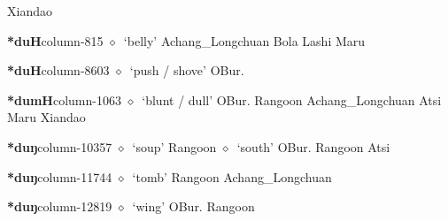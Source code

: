          Xiandao 
  \item {\footnotesize \textbf{*duH}}{\tiny column-815}
         $\diamond$~`belly'
         Achang\_Longchuan 
\hspace{1ex}
         Bola 
\hspace{1ex}
         Lashi 
\hspace{1ex}
         Maru 
  \item {\footnotesize \textbf{*duH}}{\tiny column-8603}
         $\diamond$~`push / shove'
         OBur. 
  \item {\footnotesize \textbf{*dumH}}{\tiny column-1063}
         $\diamond$~`blunt / dull'
         OBur. 
\hspace{1ex}
         Rangoon 
\hspace{1ex}
         Achang\_Longchuan 
\hspace{1ex}
         Atsi 
\hspace{1ex}
         Maru 
\hspace{1ex}
         Xiandao 
  \item {\footnotesize \textbf{*duŋ}}{\tiny column-10357}
         $\diamond$~`soup'
         Rangoon 
\hspace{1ex}
         $\diamond$~`south'
         OBur. 
\hspace{1ex}
         Rangoon 
\hspace{1ex}
         Atsi 
  \item {\footnotesize \textbf{*duŋ}}{\tiny column-11744}
         $\diamond$~`tomb'
         Rangoon 
\hspace{1ex}
         Achang\_Longchuan 
  \item {\footnotesize \textbf{*duŋ}}{\tiny column-12819}
         $\diamond$~`wing'
         OBur. 
\hspace{1ex}
         Rangoon 
\hspace{1ex}
